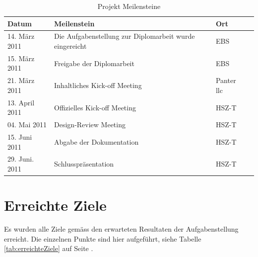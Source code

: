   \begin{table}[htb]
    \sffamily 
    \begin{center}
      \begin{tabular}{lp{7cm}ll}
        \toprule
        \textbf{Datum} & \textbf{Meilenstein} & \textbf{Ort} \\
        \midrule
        14. März 2011 &
        Die Aufgabenstellung zur Diplomarbeit wurde eingereicht &
        \ac{EBS}\\
        15. März 2011 &
        Freigabe der Diplomarbeit &
        \ac{EBS}\\
        21. März 2011 &
        Inhaltliches Kick-off Meeting &
        Panter llc\\
        13. April 2011 &
        Offizielles Kick-off Meeting &
        \ac{HSZ-T}\\
        04. Mai 2011 &
        Design-Review Meeting &
        \ac{HSZ-T}\\
        15. Juni 2011 &
        Abgabe der Dokumentation &
        \ac{HSZ-T}\\
        29. Juni. 2011 &
        Schlusspräsentation &
        \ac{HSZ-T}\\
        \bottomrule
      \end{tabular}
      \caption{Projekt Meilensteine}
      \label{tab:milestones}
    \end{center}
  \end{table}
 
  \section{Erreichte Ziele}
  
  Es wurden alle Ziele gemäss den erwarteten Resultaten der Aufgabenstellung
  erreicht. Die einzelnen Punkte sind hier aufgeführt, siehe Tabelle
  \ref{tab:erreichteZiele} auf Seite \pageref{tab:erreichteZiele}.
  \newline
  

